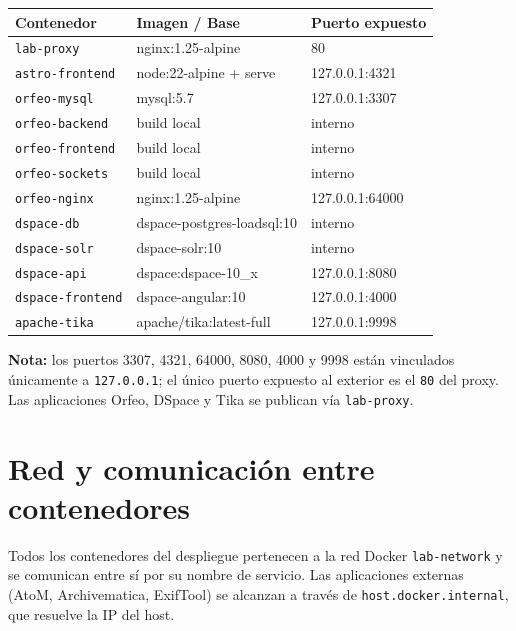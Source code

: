 \documentclass[12pt,a4paper]{report}
\begin{document}
\begin{center}
\small
\begin{tabular}{|l|l|l|}
\hline
\textbf{Contenedor} & \textbf{Imagen / Base} & \textbf{Puerto expuesto} \\
\hline
\texttt{lab-proxy} & nginx:1.25-alpine & 80 \\
\texttt{astro-frontend} & node:22-alpine + serve & 127.0.0.1:4321 \\
\texttt{orfeo-mysql} & mysql:5.7 & 127.0.0.1:3307 \\
\texttt{orfeo-backend} & build local & interno \\
\texttt{orfeo-frontend} & build local & interno \\
\texttt{orfeo-sockets} & build local & interno \\
\texttt{orfeo-nginx} & nginx:1.25-alpine & 127.0.0.1:64000 \\
\texttt{dspace-db} & dspace-postgres-loadsql:10 & interno \\
\texttt{dspace-solr} & dspace-solr:10 & interno \\
\texttt{dspace-api} & dspace:dspace-10\_x & 127.0.0.1:8080 \\
\texttt{dspace-frontend} & dspace-angular:10 & 127.0.0.1:4000 \\
\texttt{apache-tika} & apache/tika:latest-full & 127.0.0.1:9998 \\
\hline
\end{tabular}
\end{center}

\begin{mdframed}[style=importantstyle]
  \textbf{Nota:} los puertos 3307, 4321, 64000, 8080, 4000 y 9998 están
  vinculados únicamente a \texttt{127.0.0.1}; el único puerto expuesto al
  exterior es el \texttt{80} del proxy. Las aplicaciones Orfeo, DSpace y Tika
  se publican vía \texttt{lab-proxy}.
\end{mdframed}

\section{Red y comunicación entre contenedores}

Todos los contenedores del despliegue pertenecen a la red Docker
\texttt{lab-network} y se comunican entre sí por su nombre de servicio.
Las aplicaciones externas (AtoM, Archivematica, ExifTool) se alcanzan a
través de \texttt{host.docker.internal}, que resuelve la IP del host.
\end{document}
